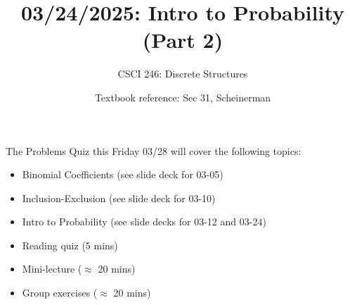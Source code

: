 \documentclass[10pt]{beamer}
\begin{document}





%
\title{03/24/2025: Intro to Probability (Part 2)}
\author{CSCI 246: Discrete Structures}
\date{Textbook reference: Sec 31, Scheinerman}

\begin{frame}
    \titlepage 
\end{frame}


\begin{frame}
\footnotesize 

\begin{myredbox}[title=\text{Announcement: This Friday's problems quiz}]

The Problems Quiz this Friday 03/28 will cover the following topics:
\begin{itemize}
\item Binomial Coefficients (see	 slide deck for 03-05)
\item Inclusion-Exclusion (see slide deck for 03-10)
\item Intro to Probability (see slide decks for 03-12 and 03-24)
\end{itemize}
\end{myredbox}

\vfill 


\begin{myyellowbox}[title=Today's Agenda]
\begin{itemize}
	\item Reading quiz (5 mins)
	\item Mini-lecture ($\approx$ 20 mins)
	\item Group exercises ($\approx$ 20 mins)
\end{itemize}


\end{myyellowbox}
\vfill 

\end{frame}
\end{document}
